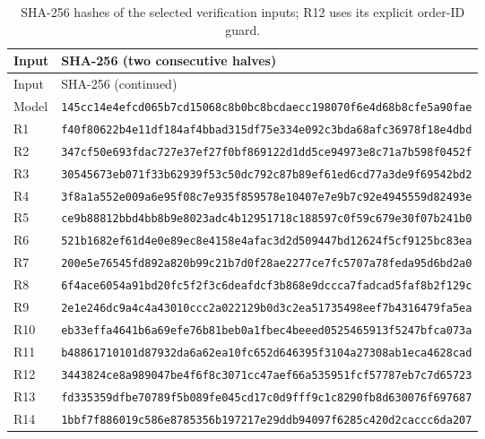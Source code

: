 \begingroup\small
\begin{longtable}{@{}p{}p{}@{}}
\caption{SHA-256 hashes of the selected verification inputs; R12 uses its explicit order-ID guard.}\label{tab:hashes}\\
\toprule Input & SHA-256 (two consecutive halves) \\ \midrule\endfirsthead
\toprule Input & SHA-256 (continued) \\ \midrule\endhead
\bottomrule\endlastfoot
Model & \texttt{145cc14e4efcd065b7cd15068c8b0bc8}\newline\texttt{bcdaecc198070f6e4d68b8cfe5a90fae} \\
R1 & \texttt{f40f80622b4e11df184af4bbad315df7}\newline\texttt{5e334e092c3bda68afc36978f18e4dbd} \\
R2 & \texttt{347cf50e693fdac727e37ef27f0bf869}\newline\texttt{122d1dd5ce94973e8c71a7b598f0452f} \\
R3 & \texttt{30545673eb071f33b62939f53c50dc79}\newline\texttt{2c87b89ef61ed6cd77a3de9f69542bd2} \\
R4 & \texttt{3f8a1a552e009a6e95f08c7e935f8595}\newline\texttt{78e10407e7e9b7c92e4945559d82493e} \\
R5 & \texttt{ce9b88812bbd4bb8b9e8023adc4b1295}\newline\texttt{1718c188597c0f59c679e30f07b241b0} \\
R6 & \texttt{521b1682ef61d4e0e89ec8e4158e4afa}\newline\texttt{c3d2d509447bd12624f5cf9125bc83ea} \\
R7 & \texttt{200e5e76545fd892a820b99c21b7d0f2}\newline\texttt{8ae2277ce7fc5707a78feda95d6bd2a0} \\
R8 & \texttt{6f4ace6054a91bd20fc5f2f3c6deafdc}\newline\texttt{f3b868e9dccca7fadcad5faf8b2f129c} \\
R9 & \texttt{2e1e246dc9a4c4a43010ccc2a022129b}\newline\texttt{0d3c2ea51735498eef7b4316479fa5ea} \\
R10 & \texttt{eb33effa4641b6a69efe76b81beb0a1f}\newline\texttt{bec4beeed0525465913f5247bfca073a} \\
R11 & \texttt{b48861710101d87932da6a62ea10fc65}\newline\texttt{2d646395f3104a27308ab1eca4628cad} \\
R12 & \texttt{3443824ce8a989047be4f6f8c3071cc4}\newline\texttt{7aef66a535951fcf57787eb7c7d65723} \\
R13 & \texttt{fd335359dfbe70789f5b089fe045cd17}\newline\texttt{c0d9fff9c1c8290fb8d630076f697687} \\
R14 & \texttt{1bbf7f886019c586e8785356b197217e}\newline\texttt{29ddb94097f6285c420d2caccc6da207} \\
\end{longtable}
\endgroup
